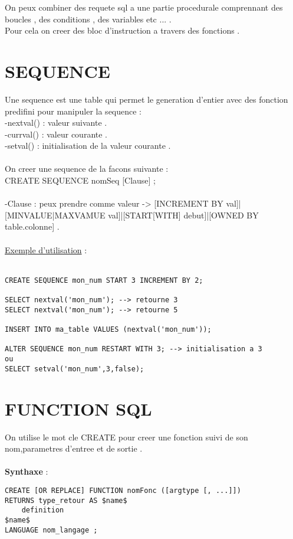 \documentclass[a4paper,12pt,openany]{book}
\begin{document}
On peux combiner des requete sql a une partie procedurale comprennant des boucles , des conditions , des variables etc ... .\\
Pour cela on creer des bloc d'instruction a travers des fonctions .\\

\section{SEQUENCE}
Une sequence est une table qui permet le generation d'entier avec des fonction predifini pour manipuler la sequence : \\
-nextval() : valeur suivante .\\
-currval() : valeur courante .\\
-setval() : initialisation de la valeur courante .\\
\\
On creer une sequence de la facons suivante :\\
CREATE SEQUENCE nomSeq [Clause] ;\\
\\
-Clause : peux prendre comme valeur -> [INCREMENT BY val]|[MINVALUE|MAXVAMUE val]|[START[WITH] debut]|[OWNED BY {table.colonne}] .\\
\\
\underline{Exemple d'utilisation} : \\
\\
\begin{verbatim}
CREATE SEQUENCE mon_num START 3 INCREMENT BY 2;

SELECT nextval('mon_num'); --> retourne 3
SELECT nextval('mon_num'); --> retourne 5

INSERT INTO ma_table VALUES (nextval('mon_num'));

ALTER SEQUENCE mon_num RESTART WITH 3; --> initialisation a 3
ou
SELECT setval('mon_num',3,false);
\end{verbatim}


\section{FUNCTION SQL}
On utilise le mot cle CREATE pour creer une fonction suivi de son nom,parametres d'entree et de sortie .\\
\\
\textbf{Synthaxe} : \\
\begin{verbatim}
CREATE [OR REPLACE] FUNCTION nomFonc ([argtype [, ...]])
RETURNS type_retour AS $name$
 	definition 
$name$
LANGUAGE nom_langage ;
\end{verbatim}
\end{document}
